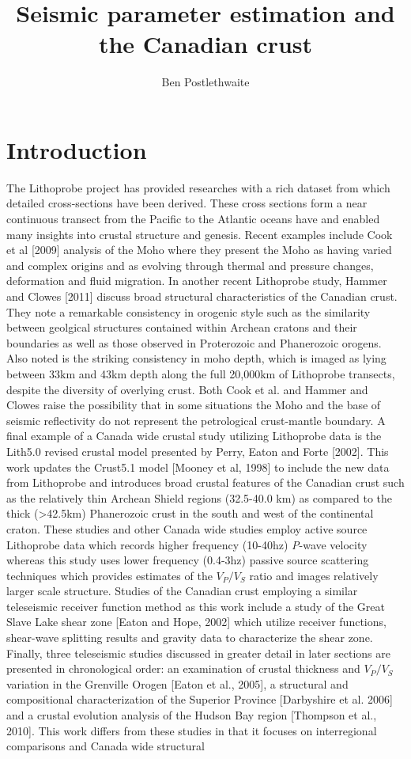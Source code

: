 \documentclass[draft, 12pt]{article}
\title{Seismic parameter estimation and the Canadian crust}
\author{Ben Postlethwaite}
\begin{document}
\begin{abstract}

\end{abstract}

\section{Introduction}


The Lithoprobe project has provided researches with a rich dataset from which detailed cross-sections have been derived. These cross sections form a near continuous transect from the Pacific to the Atlantic oceans have and enabled many insights into crustal structure and genesis. Recent examples include Cook et al [2009] analysis of the Moho where they present the Moho as having varied and complex origins and as evolving through thermal and pressure changes, deformation and fluid migration. In another recent Lithoprobe study, Hammer and Clowes [2011] discuss broad structural characteristics of the Canadian crust. They note a remarkable consistency in orogenic style such as the similarity between geolgical structures contained within Archean cratons and their boundaries as well as those observed in Proterozoic and Phanerozoic orogens. Also noted is the striking consistency in moho depth, which is imaged as lying between 33km and 43km depth along the full 20,000km of Lithoprobe transects, despite the diversity of overlying crust. Both Cook et al. and Hammer and Clowes raise the possibility that in some situations the Moho and the base of seismic reflectivity do not represent the petrological crust-mantle boundary. A final example of a Canada wide crustal study utilizing Lithoprobe data is the Lith5.0 revised crustal model presented by Perry, Eaton and Forte [2002]. This work updates the Crust5.1 model [Mooney et al, 1998] to include the new data from Lithoprobe and introduces broad crustal features of the Canadian crust such as the relatively thin Archean Shield regions (32.5-40.0 km) as compared to the thick (>42.5km) Phanerozoic crust in the south and west of the continental craton. These studies and other Canada wide studies employ active source Lithoprobe data which records higher frequency (10-40hz) {\it P}-wave velocity whereas this study uses lower frequency (0.4-3hz) passive source scattering techniques which provides estimates of the $V_P/V_S$ ratio and images relatively larger scale structure. Studies of the Canadian crust employing a similar teleseismic receiver function method as this work include a study of the Great Slave Lake shear zone [Eaton and Hope, 2002] which utilize receiver functions, shear-wave splitting results and gravity data to characterize the shear zone. Finally, three teleseismic studies discussed in greater detail in later sections are presented in chronological order: an examination of crustal thickness and $V_P/V_S$ variation in the Grenville Orogen [Eaton et al., 2005], a structural and compositional characterization of the Superior Province [Darbyshire et al. 2006] and a crustal evolution analysis of the Hudson Bay region [Thompson et al., 2010]. This work differs from these studies in that it focuses on interregional comparisons and Canada wide structural 
\end{document}

